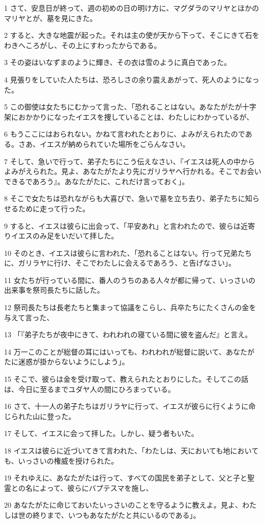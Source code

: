 \par 1 さて、安息日が終って、週の初めの日の明け方に、マグダラのマリヤとほかのマリヤとが、墓を見にきた。
\par 2 すると、大きな地震が起った。それは主の使が天から下って、そこにきて石をわきへころがし、その上にすわったからである。
\par 3 その姿はいなずまのように輝き、その衣は雪のように真白であった。
\par 4 見張りをしていた人たちは、恐ろしさの余り震えあがって、死人のようになった。
\par 5 この御使は女たちにむかって言った、「恐れることはない。あなたがたが十字架におかかりになったイエスを捜していることは、わたしにわかっているが、
\par 6 もうここにはおられない。かねて言われたとおりに、よみがえられたのである。さあ、イエスが納められていた場所をごらんなさい。
\par 7 そして、急いで行って、弟子たちにこう伝えなさい、『イエスは死人の中からよみがえられた。見よ、あなたがたより先にガリラヤへ行かれる。そこでお会いできるであろう』。あなたがたに、これだけ言っておく」。
\par 8 そこで女たちは恐れながらも大喜びで、急いで墓を立ち去り、弟子たちに知らせるために走って行った。
\par 9 すると、イエスは彼らに出会って、「平安あれ」と言われたので、彼らは近寄りイエスのみ足をいだいて拝した。
\par 10 そのとき、イエスは彼らに言われた、「恐れることはない。行って兄弟たちに、ガリラヤに行け、そこでわたしに会えるであろう、と告げなさい」。
\par 11 女たちが行っている間に、番人のうちのある人々が都に帰って、いっさいの出来事を祭司長たちに話した。
\par 12 祭司長たちは長老たちと集まって協議をこらし、兵卒たちにたくさんの金を与えて言った、
\par 13 「『弟子たちが夜中にきて、われわれの寝ている間に彼を盗んだ』と言え。
\par 14 万一このことが総督の耳にはいっても、われわれが総督に説いて、あなたがたに迷惑が掛からないようにしよう」。
\par 15 そこで、彼らは金を受け取って、教えられたとおりにした。そしてこの話は、今日に至るまでユダヤ人の間にひろまっている。
\par 16 さて、十一人の弟子たちはガリラヤに行って、イエスが彼らに行くように命じられた山に登った。
\par 17 そして、イエスに会って拝した。しかし、疑う者もいた。
\par 18 イエスは彼らに近づいてきて言われた、「わたしは、天においても地においても、いっさいの権威を授けられた。
\par 19 それゆえに、あなたがたは行って、すべての国民を弟子として、父と子と聖霊との名によって、彼らにバプテスマを施し、
\par 20 あなたがたに命じておいたいっさいのことを守るように教えよ。見よ、わたしは世の終りまで、いつもあなたがたと共にいるのである」。


